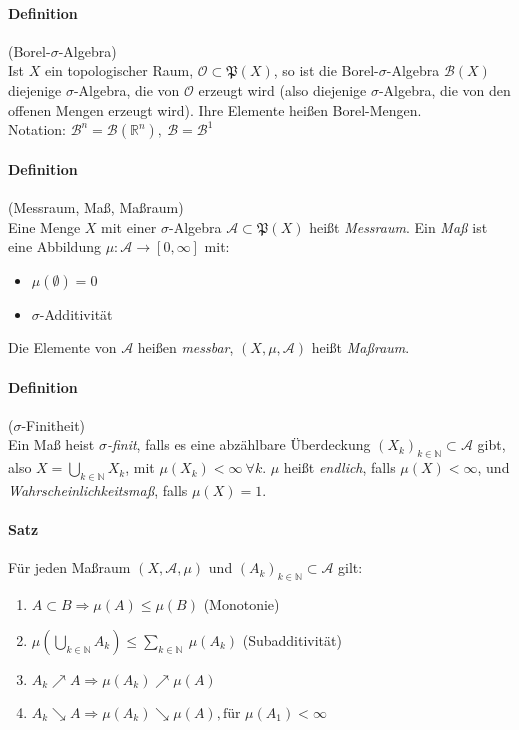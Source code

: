 \documentclass[12pt,a4paper,fleqn]{article}
\begin{document}
\paragraph{Definition}(Borel-$\sigma$-Algebra)\\
Ist $X$ ein topologischer Raum, $\mathcal{O} \subset \mathfrak{P}(X)$, so ist die Borel-$\sigma$-Algebra $\mathcal{B}(X)$ diejenige $\sigma$-Algebra, die von $\mathcal{O}$ erzeugt wird (also diejenige $\sigma$-Algebra, die von den offenen Mengen erzeugt wird). Ihre Elemente heißen Borel-Mengen.\\
Notation:
$\mathcal{B}^n=\mathcal{B}(\mathbb{R}^n),\ \mathcal{B}=\mathcal{B}^1$

\paragraph{Definition}(Messraum, Maß, Maßraum)\\
Eine Menge $X$ mit einer $\sigma$-Algebra $\mathcal{A} \subset \mathfrak{P}(X)$ heißt \textit{Messraum}. Ein \textit{Maß} ist eine Abbildung $\mu\colon \mathcal{A} \rightarrow [0, \infty]$ mit:
\begin{itemize}
\item $\mu (\emptyset) = 0$
\item $\sigma$-Additivität
\end{itemize}
Die Elemente von $\mathcal{A}$ heißen \textit{messbar}, $(X, \mu, \mathcal{A})$ heißt \textit{Maßraum}.

\paragraph{Definition}($\sigma$-Finitheit)\\
Ein Maß heist $\sigma$\textit{-finit}, falls es eine abzählbare Überdeckung $(X_k)_{k \in \mathbb{N}} \subset \mathcal{A}$ gibt, also $X = \bigcup_{k \in \mathbb{N}} X_k$, mit $\mu (X_k) < \infty\ \forall k$. $\mu$ heißt \textit{endlich}, falls $\mu (X) < \infty$, und \textit{Wahrscheinlichkeitsmaß}, falls $\mu (X) =1$.

\paragraph{Satz} Für jeden Maßraum $(X, \mathcal{A}, \mu)$ und $(A_k)_{k \in \mathbb{N}} \subset\mathcal{A}$ gilt:
\begin{enumerate}
\item$A \subset B \Rightarrow \mu (A) \leq \mu(B)$ (Monotonie)
\item$\mu(\bigcup_{k \in \mathbb{N}}A_k) \leq \sum_{k \in \mathbb{N}}\  \mu (A_k)$ (Subadditivität)
\item$A_k \nearrow A \Rightarrow \mu(A_k) \nearrow \mu(A)$
\item$A_k \searrow A \Rightarrow \mu(A_k) \searrow \mu(A), \text{für } \mu(A_1) <\infty$
\end{enumerate}
\end{document}
